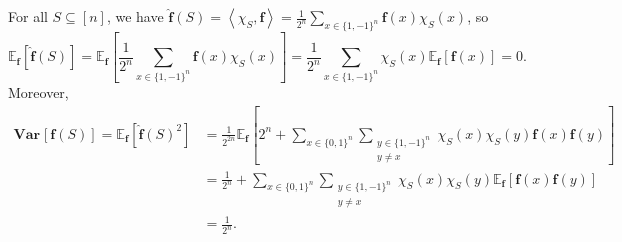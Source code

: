 \documentclass[12pt]{article}
\newcommand{\bitset}{\{0,1\}}
\newcommand{\fbitset}{\{1,-1\}}
\newcommand{\E}[2]{\mathbb E_{#1}\left[#2\right]}
\newcommand{\Var}[2]{\mathbf{Var}_{#1}\left[#2\right]}
\newcommand{\eqn}[1]{\begin{equation*}#1\end{equation*}}
\newcommand{\hf}{\widehat{f}}
\newcommand{\sumx}{\sum_{x \in \bitset^n}}
\newcommand{\sumxf}{\sum_{x \in \fbitset^n}}
\newcommand{\sumS}{\sum_{S \subseteq [n]}}
\renewcommand{\ip}[1]{\left\langle#1\right\rangle}
\begin{document}
\subsection{}

\subsection{}
For all $S \subseteq [n]$, we have $\hat{\mathbf{f}}(S) = \ip{\chi_S,\mathbf{f}} = \frac1{2^n}\sumxf\mathbf{f}(x) \chi_S(x)$, so 
\eqn{\E{\mathbf{f}}{\hat{\mathbf{f}}(S)} = \E{\mathbf{f}}{\frac1{2^n}\sumxf \mathbf{f}(x) \chi_S(x)} = \frac1{2^n}\sumxf\chi_S(x) \E{\mathbf{f}}{\mathbf{f}(x)} = 0.}
Moreover,
\begin{align*}
    \Var{}{\mathbf{f}(S)} = \E{\mathbf{f}}{\mathbf{\hat{f}}(S)^2} &= \frac1{2^{2n}}\E{\mathbf{f}}{2^n + \sumx \sum_{\substack{y \in \fbitset^n\\ y \neq x}} \chi_S(x) \chi_S(y) \mathbf{f}(x) \mathbf{f}(y)}\\
    &= \frac1{2^n} + \sumx \sum_{\substack{y \in \fbitset^n\\ y \neq x}} \chi_S(x) \chi_S(y) \E{\mathbf{f}}{\mathbf{f}(x) \mathbf{f}(y)}\\
    &= \frac1{2^n}.
\end{align*}

\subsection{}

\subsection{}

\subsection{}

\subsection{}

\subsection{}
\end{document}
